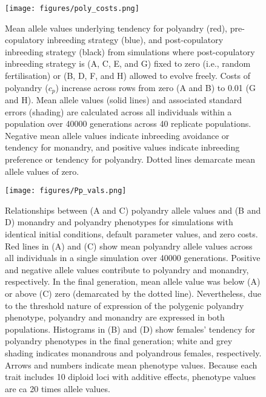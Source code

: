 \documentclass[12pt]{article}
\begin{document}
\clearpage
\begin{figure}
\begin{center}				
\texttt{[image: figures/poly\_costs.png]}
\end{center}
\caption{Mean allele values underlying tendency for polyandry (red), pre-copulatory inbreeding strategy (blue), and post-copulatory inbreeding strategy (black) from simulations where post-copulatory inbreeding strategy is (A, C, E, and G) fixed to zero (i.e., random fertilisation) or (B, D, F, and H) allowed to evolve freely. Costs of polyandry ($c_p$) increase across rows from zero (A and B) to 0.01 (G and H). Mean allele values (solid lines) and associated standard errors (shading) are calculated across all individuals within a population over 40000 generations across 40 replicate populations. Negative mean allele values indicate inbreeding avoidance or tendency for monandry, and positive values indicate inbreeding preference or tendency for polyandry. Dotted lines demarcate mean allele values of zero.}
\end{figure}

\clearpage
\begin{figure}
\begin{center}				
\texttt{[image: figures/Pp\_vals.png]}
\end{center}
\caption{Relationships between (A and C) polyandry allele values and (B and D) monandry and polyandry phenotypes for simulations with identical initial conditions, default parameter values, and zero costs. Red lines in (A) and (C) show mean polyandry allele values across all individuals in a single simulation over 40000 generations. Positive and negative allele values contribute to polyandry and monandry, respectively. In the final generation, mean allele value was below (A) or above (C) zero (demarcated by the dotted line). Nevertheless, due to the threshold nature of expression of the polygenic polyandry phenotype, polyandry and monandry are expressed in both populations. Histograms in (B) and (D) show females' tendency for polyandry phenotypes in the final generation; white and grey shading indicates monandrous and polyandrous females, respectively. Arrows and numbers indicate mean phenotype values. Because each trait includes 10 diploid loci with additive effects, phenotype values are ca 20 times allele values.}
\end{figure}
\end{document}
